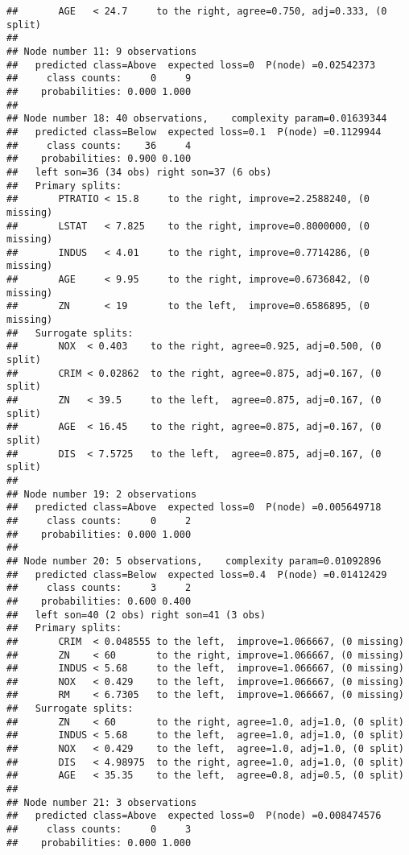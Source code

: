 \documentclass[
]{article}
\begin{document}
\begin{verbatim}
##       AGE   < 24.7     to the right, agree=0.750, adj=0.333, (0 split)
## 
## Node number 11: 9 observations
##   predicted class=Above  expected loss=0  P(node) =0.02542373
##     class counts:     0     9
##    probabilities: 0.000 1.000 
## 
## Node number 18: 40 observations,    complexity param=0.01639344
##   predicted class=Below  expected loss=0.1  P(node) =0.1129944
##     class counts:    36     4
##    probabilities: 0.900 0.100 
##   left son=36 (34 obs) right son=37 (6 obs)
##   Primary splits:
##       PTRATIO < 15.8     to the right, improve=2.2588240, (0 missing)
##       LSTAT   < 7.825    to the right, improve=0.8000000, (0 missing)
##       INDUS   < 4.01     to the right, improve=0.7714286, (0 missing)
##       AGE     < 9.95     to the right, improve=0.6736842, (0 missing)
##       ZN      < 19       to the left,  improve=0.6586895, (0 missing)
##   Surrogate splits:
##       NOX  < 0.403    to the right, agree=0.925, adj=0.500, (0 split)
##       CRIM < 0.02862  to the right, agree=0.875, adj=0.167, (0 split)
##       ZN   < 39.5     to the left,  agree=0.875, adj=0.167, (0 split)
##       AGE  < 16.45    to the right, agree=0.875, adj=0.167, (0 split)
##       DIS  < 7.5725   to the left,  agree=0.875, adj=0.167, (0 split)
## 
## Node number 19: 2 observations
##   predicted class=Above  expected loss=0  P(node) =0.005649718
##     class counts:     0     2
##    probabilities: 0.000 1.000 
## 
## Node number 20: 5 observations,    complexity param=0.01092896
##   predicted class=Below  expected loss=0.4  P(node) =0.01412429
##     class counts:     3     2
##    probabilities: 0.600 0.400 
##   left son=40 (2 obs) right son=41 (3 obs)
##   Primary splits:
##       CRIM  < 0.048555 to the left,  improve=1.066667, (0 missing)
##       ZN    < 60       to the right, improve=1.066667, (0 missing)
##       INDUS < 5.68     to the left,  improve=1.066667, (0 missing)
##       NOX   < 0.429    to the left,  improve=1.066667, (0 missing)
##       RM    < 6.7305   to the left,  improve=1.066667, (0 missing)
##   Surrogate splits:
##       ZN    < 60       to the right, agree=1.0, adj=1.0, (0 split)
##       INDUS < 5.68     to the left,  agree=1.0, adj=1.0, (0 split)
##       NOX   < 0.429    to the left,  agree=1.0, adj=1.0, (0 split)
##       DIS   < 4.98975  to the right, agree=1.0, adj=1.0, (0 split)
##       AGE   < 35.35    to the left,  agree=0.8, adj=0.5, (0 split)
## 
## Node number 21: 3 observations
##   predicted class=Above  expected loss=0  P(node) =0.008474576
##     class counts:     0     3
##    probabilities: 0.000 1.000 

\end{verbatim}
\end{document}
